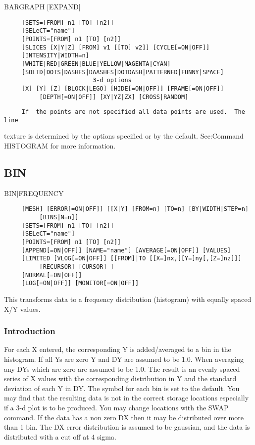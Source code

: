 BARGRAPH [EXPAND] 
\begin{verbatim}
     [SETS=[FROM] n1 [TO] [n2]] 
     [SELeCT="name"] 
     [POINTS=[FROM] n1 [TO] [n2]] 
     [SLICES [X|Y|Z] [FROM] v1 [[TO] v2]] [CYCLE[=ON|OFF]] 
     [INTENSITY|WIDTH=n] 
     [WHITE|RED|GREEN|BLUE|YELLOW|MAGENTA|CYAN] 
     [SOLID|DOTS|DASHES|DAASHES|DOTDASH|PATTERNED|FUNNY|SPACE] 
                         3-d options 
     [X] [Y] [Z] [BLOCK|LEGO] [HIDE[=ON|OFF]] [FRAME[=ON|OFF]]
          [DEPTH[=ON|OFF]] [XY|YZ|ZX] [CROSS|RANDOM] 
\end{verbatim}

\begin{verbatim}
     If  the points are not specified all data points are used.  The line
\end{verbatim}
texture is determined  by  the  options  specified  or  by  the  default.
See:Command HISTOGRAM for more information.  
\subsection{BIN}
BIN$|$FREQUENCY 
\begin{verbatim}
     [MESH] [ERROR[=ON|OFF]] [[X|Y] [FROM=n] [TO=n] [BY|WIDTH|STEP=n]
          [BINS|N=n]] 
     [SETS=[FROM] n1 [TO] [n2]] 
     [SELeCT="name"] 
     [POINTS=[FROM] n1 [TO] [n2]] 
     [APPEND[=ON|OFF]] [NAME="name"] [AVERAGE[=ON|OFF]] [VALUES] 
     [LIMITED [VLOG[=ON|OFF]] [[FROM]|TO [[X=]nx,[[Y=]ny[,[Z=]nz]]]
          [RECURSOR] [CURSOR] ] 
     [NORMAL[=ON|OFF]] 
     [LOG[=ON|OFF]] [MONITOR[=ON|OFF]] 
\end{verbatim}
This transforms data to a frequency distribution (histogram) with equally
spaced X/Y values.  
\subsubsection{Introduction}
For  each  X entered, the corresponding Y is added/averaged to a bin in
the histogram.  If all Ys are zero Y and DY  are  assumed  to  be  1.0.
When  averaging  any  DYs  which  are  zero are assumed to be 1.0.  The
result is an evenly spaced series of X values  with  the  corresponding
distribution  in  Y  and  the  standard deviation of each Y in DY.  The
symbol for each bin is set to the  default.   You  may  find  that  the
resulting  data is not in the correct storage locations especially if a
3-d plot is to be produced.  You may change  locations  with  the  SWAP
command.  If the data has a non zero DX then it may be distributed over
more than 1 bin.  The DX error distribution is assumed to be  gaussian,
and the data is distributed with a cut off at 4 sigma.  
